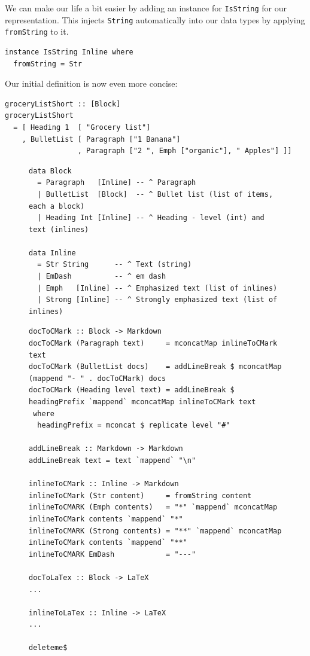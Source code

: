 We can make our life a bit easier by adding an instance for \texttt{IsString}
for our representation. This injects \texttt{String} automatically into our data
types by applying \texttt{fromString} to it.

\begin{lstlisting}
instance IsString Inline where
  fromString = Str
\end{lstlisting}


Our initial definition is now even more concise:

\begin{lstlisting}
groceryListShort :: [Block]
groceryListShort
  = [ Heading 1  [ "Grocery list"]
    , BulletList [ Paragraph ["1 Banana"]
                 , Paragraph ["2 ", Emph ["organic"], " Apples"] ]]
\end{lstlisting}

\begin{figure}
\begin{lstlisting}
data Block
  = Paragraph   [Inline] -- ^ Paragraph
  | BulletList  [Block]  -- ^ Bullet list (list of items, each a block)
  | Heading Int [Inline] -- ^ Heading - level (int) and text (inlines)
  
data Inline
  = Str String      -- ^ Text (string)
  | EmDash          -- ^ em dash
  | Emph   [Inline] -- ^ Emphasized text (list of inlines)
  | Strong [Inline] -- ^ Strongly emphasized text (list of inlines)
\end{lstlisting}
\end{figure}

\begin{figure}
\begin{lstlisting}
docToCMark :: Block -> Markdown
docToCMark (Paragraph text)     = mconcatMap inlineToCMark text
docToCMark (BulletList docs)    = addLineBreak $ mconcatMap (mappend "- " . docToCMark) docs
docToCMark (Heading level text) = addLineBreak $ headingPrefix `mappend` mconcatMap inlineToCMark text
 where
  headingPrefix = mconcat $ replicate level "#"

addLineBreak :: Markdown -> Markdown
addLineBreak text = text `mappend` "\n"

inlineToCMark :: Inline -> Markdown
inlineToCMark (Str content)     = fromString content
inlineToCMARK (Emph contents)   = "*" `mappend` mconcatMap inlineToCMark contents `mappend` "*"
inlineToCMARK (Strong contents) = "**" `mappend` mconcatMap inlineToCMark contents `mappend` "**"
inlineToCMARK EmDash            = "---"

docToLaTex :: Block -> LaTeX
...

inlineToLaTex :: Inline -> LaTeX
...

deleteme$
\end{lstlisting}
\end{figure}

